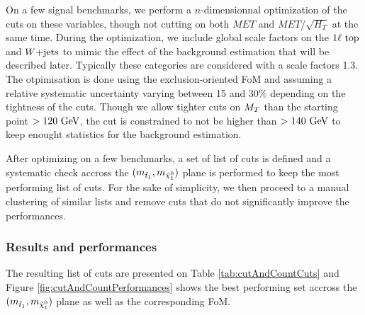             On a few signal benchmarks, we perform a $n$-dimensionnal optimization of the cuts on these variables,
            though not cutting on both $MET$ and $MET/\sqrt{H_T}$ at the same time. During the optimization,
            we include global scale factors on the $1\ell~\text{top}$ and $\text{$W$+jets}$ to mimic the effect of the background
            estimation that will be described later. Typically these categories are considered with a scale factors
            1.3. The otpimisation is done using the exclusion-oriented FoM and assuming a relative systematic uncertainty
            varying between 15 and 30\% depending on the tightness of the cuts. Though we allow tighter cuts on $M_T$
            than the starting point $> 120 ~\text{GeV}$, the cut is constrained to not be higher than $> 140 ~\text{GeV}$ to keep
            enought statistics for the background estimation.

            After optimizing on a few benchmarks, a set of list of cuts is defined and a systematic check accross the
            $(m_{\tilde{t}_1},m_{\tilde{\chi}_1^0})$ plane is performed to keep the most performing list of cuts. For the
            sake of simplicity, we then proceed to a manual clustering of similar lists and remove cuts that do not 
            significantly improve the performances.

            \subsubsection{Results and performances}

            The resulting list of cuts are presented on Table \ref{tab:cutAndCountCuts} and Figure \ref{fig:cutAndCountPerformances}
            shows the best performing set accross the $(m_{\tilde{t}_1},m_{\tilde{\chi}_1^0})$ plane as well as the
            corresponding FoM.

